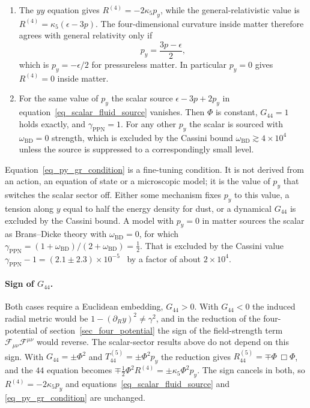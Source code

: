 \documentclass[anonymous]{iopjournal}
\begin{document}
\begin{enumerate}
\item The $yy$ equation gives $R^{(4)}=-2\kappa_5 p_y$, while the general-relativistic value is $R^{(4)}=\kappa_5(\epsilon-3p)$. The four-dimensional curvature inside matter therefore agrees with general relativity only if
\begin{equation}\label{eq_py_gr_condition}
    p_y=\frac{3p-\epsilon}{2},
\end{equation}
which is $p_y=-\epsilon/2$ for pressureless matter. In particular $p_y=0$ gives $R^{(4)}=0$ inside matter.
\item For the same value of $p_y$ the scalar source $\epsilon-3p+2p_y$ in equation~\eqref{eq_scalar_fluid_source} vanishes. Then $\Phi$ is constant, $G_{44}=1$ holds exactly, and $\gamma_{\mathrm{PPN}}=1$. For any other $p_y$ the scalar is sourced with $\omega_{\mathrm{BD}}=0$ strength, which is excluded by the Cassini bound $\omega_{\mathrm{BD}}\gtrsim4\times10^{4}$ unless the source is suppressed to a correspondingly small level.
\end{enumerate}

Equation~\eqref{eq_py_gr_condition} is a fine-tuning condition. It is not derived from an action, an equation of state or a microscopic model; it is the value of $p_y$ that switches the scalar sector off. Either some mechanism fixes $p_y$ to this value, a tension along $y$ equal to half the energy density for dust, or a dynamical $G_{44}$ is excluded by the Cassini bound. A model with $p_y=0$ in matter sources the scalar as Brans--Dicke theory with $\omega_{\mathrm{BD}}=0$, for which $\gamma_{\mathrm{PPN}}=(1+\omega_{\mathrm{BD}})/(2+\omega_{\mathrm{BD}})=\tfrac12$. That is excluded by the Cassini value $\gamma_{\mathrm{PPN}}-1=(2.1\pm2.3)\times10^{-5}$~\cite{Bertotti2003} by a factor of about $2\times10^{4}$.

\paragraph{Sign of $G_{44}$.} Both cases require a Euclidean embedding, $G_{44}>0$. With $G_{44}<0$ the induced radial metric would be $1-\left(\partial_R y\right)^2\neq\gamma^2$, and in the reduction of the four-potential of section~\ref{sec_four_potential} the sign of the field-strength term $\mathcal{F}_{\mu\nu}\mathcal{F}^{\mu\nu}$ would reverse. The scalar-sector results above do not depend on this sign. With $G_{44}=\pm\Phi^2$ and $T_{44}^{(5)}=\pm\Phi^2p_y$ the reduction gives $R_{44}^{(5)}=\mp\Phi\,\Box\Phi$, and the $44$ equation becomes $\mp\tfrac12\Phi^2R^{(4)}=\pm\kappa_5\Phi^2p_y$. The sign cancels in both, so $R^{(4)}=-2\kappa_5p_y$ and equations~\eqref{eq_scalar_fluid_source} and \eqref{eq_py_gr_condition} are unchanged.
\end{document}
